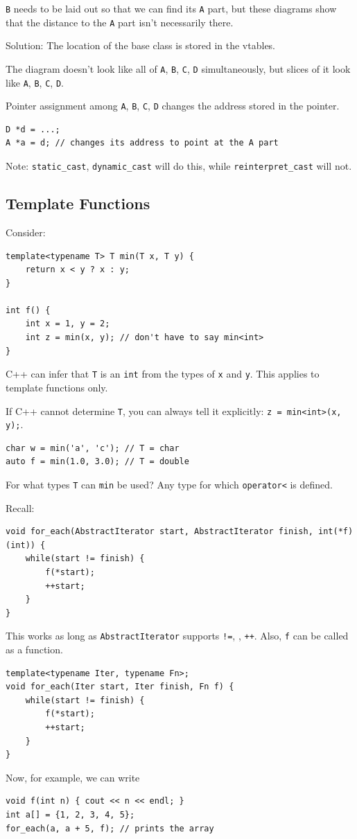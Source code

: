 \documentclass[11pt]{article}
\theoremstyle{definition}
\begin{document}
{\tt B} needs to be laid out so that we can find its {\tt A} part, but these diagrams show that the distance to the {\tt A} part isn't necessarily there.

{\sc Solution:} The location of the base class is stored in the vtables.

The diagram doesn't look like all of {\tt A}, {\tt B}, {\tt C}, {\tt D} simultaneously, but slices of it look like {\tt A}, {\tt B}, {\tt C}, {\tt D}. 

Pointer assignment among {\tt A}, {\tt B}, {\tt C}, {\tt D} changes the address stored in the pointer.
\begin{lstlisting}
D *d = ...;
A *a = d; // changes its address to point at the A part
\end{lstlisting}\vspace{-1.5ex}
Note: {\tt static\_cast}, {\tt dynamic\_cast} will do this, while {\tt reinterpret\_cast} will not.

\subsection{Template Functions}
Consider:
\begin{lstlisting}
template<typename T> T min(T x, T y) {
    return x < y ? x : y;
}

int f() {
    int x = 1, y = 2;
    int z = min(x, y); // don't have to say min<int>
}
\end{lstlisting}\vspace{-1.5ex}
C++ can infer that {\tt T} is an {\tt int} from the types of {\tt x} and {\tt y}. This applies to template functions only. 

If C++ cannot determine {\tt T}, you can always tell it explicitly: {\tt z = min<int>(x, y);}.
\begin{lstlisting}
char w = min('a', 'c'); // T = char
auto f = min(1.0, 3.0); // T = double
\end{lstlisting}\vspace{-1.5ex}
For what types {\tt T} can {\tt min} be used? Any type for which {\tt operator<} is defined.

Recall:
\begin{lstlisting}
void for_each(AbstractIterator start, AbstractIterator finish, int(*f)(int)) {
    while(start != finish) {
        f(*start);
        ++start;
    }
}
\end{lstlisting}\vspace{-1.5ex}
This works as long as {\tt AbstractIterator} supports {\tt !=}, {\tt *}, {\tt ++}. Also, {\tt f} can be called as a function.
\begin{lstlisting}
template<typename Iter, typename Fn>;
void for_each(Iter start, Iter finish, Fn f) {
    while(start != finish) {
        f(*start);
        ++start;
    }
}
\end{lstlisting}\vspace{-1.5ex}
Now, for example, we can write
\begin{lstlisting}
void f(int n) { cout << n << endl; }
int a[] = {1, 2, 3, 4, 5};
for_each(a, a + 5, f); // prints the array
\end{lstlisting}\vspace{-1.5ex}
\end{document}
